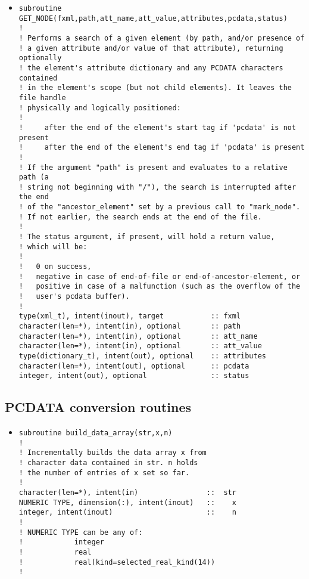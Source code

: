 \documentclass[11pt]{article}
\begin{document}
\begin{itemize}
\item
\begin{verbatim}
subroutine GET_NODE(fxml,path,att_name,att_value,attributes,pcdata,status)
!
! Performs a search of a given element (by path, and/or presence of
! a given attribute and/or value of that attribute), returning optionally
! the element's attribute dictionary and any PCDATA characters contained
! in the element's scope (but not child elements). It leaves the file handle
! physically and logically positioned:
!
!     after the end of the element's start tag if 'pcdata' is not present
!     after the end of the element's end tag if 'pcdata' is present
!
! If the argument "path" is present and evaluates to a relative path (a
! string not beginning with "/"), the search is interrupted after the end
! of the "ancestor_element" set by a previous call to "mark_node".
! If not earlier, the search ends at the end of the file.
!
! The status argument, if present, will hold a return value,
! which will be:
!
!   0 on success,
!   negative in case of end-of-file or end-of-ancestor-element, or
!   positive in case of a malfunction (such as the overflow of the
!   user's pcdata buffer).
!
type(xml_t), intent(inout), target           :: fxml
character(len=*), intent(in), optional       :: path
character(len=*), intent(in), optional       :: att_name
character(len=*), intent(in), optional       :: att_value
type(dictionary_t), intent(out), optional    :: attributes
character(len=*), intent(out), optional      :: pcdata
integer, intent(out), optional               :: status
\end{verbatim}
\end{itemize}
%
\subsection{PCDATA conversion routines}
\begin{itemize}
\item

\begin{verbatim}
subroutine build_data_array(str,x,n)
!
! Incrementally builds the data array x from
! character data contained in str. n holds
! the number of entries of x set so far.
!
character(len=*), intent(in)                ::  str
NUMERIC TYPE, dimension(:), intent(inout)   ::    x
integer, intent(inout)                      ::    n
!
! NUMERIC TYPE can be any of:
!            integer
!            real
!            real(kind=selected_real_kind(14))
!
\end{verbatim}
\end{itemize}
\end{document}
